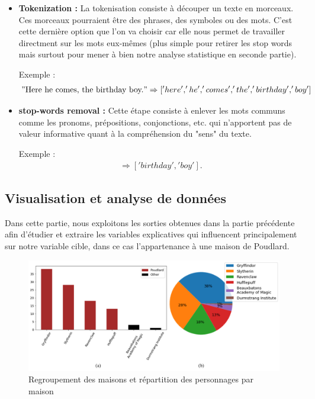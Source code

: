 \documentclass[11pt]{article}
\begin{document}
\begin{center}
\begin{itemize}
    \item \textbf{Tokenization :} La tokenisation consiste à découper un texte en morceaux. Ces morceaux pourraient être des phrases, des symboles ou des mots. C’est cette dernière option que l’on va choisir car elle nous permet de travailler directment sur les mots eux-mêmes (plus simple pour retirer les stop words mais surtout pour mener à bien notre analyse statistique en seconde partie).\par
    Exemple :
    \begin{align*}
        "\text{Here he comes, the birthday boy.}"  \Rightarrow ['here', 'he', 'comes', 'the', 'birthday', 'boy']
    \end{align*}
    
    \item \textbf{stop-words removal :} Cette étape consiste à enlever les mots communs comme les pronoms, prépositions, conjonctions, etc. qui n'apportent pas de valeur informative quant à la compréhension du "sens" du texte.\par
    Exemple :
    \begin{align*}
        ['here', 'he', 'come', 'the', 'birthday', 'boy'] \Rightarrow ['birthday', 'boy'].
    \end{align*}
\end{itemize}

\newpage

\subsection{Visualisation et analyse de données}

Dans cette partie, nous exploitons les sorties obtenues dans la partie précédente afin d'étudier et extraire les variables explicatives qui influencent principalement sur notre variable cible, dans ce cas l’appartenance à une maison de Poudlard.\par

\begin{figure}[hbt!]
    \centering
    \includegraphics[width= 18 cm]{./figures/rep-houses.png}
    \caption{Regroupement des maisons et répartition des personnages par maison}
    \label{Regroupement}
\end{figure}
\FloatBarrier


\end{center}
\end{document}
